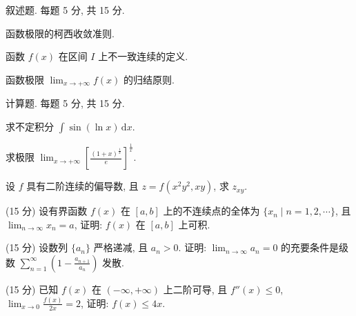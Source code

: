 \par{}
叙述题. 每题 5 分, 共 15 分.\par
函数极限的柯西收敛准则.\par
函数 $f(x)$ 在区间 $I$ 上不一致连续的定义.\par
函数极限 $\lim_{x\to +\infty}f(x)$ 的归结原则.\par
\par{}
计算题. 每题 5 分, 共 15 分.\par
求不定积分 $\int \sin (\ln x) \, \mathrm{d}x$.\par
求极限 $\lim_{x\to +\infty}\left[\frac{(1 + x)^{\frac{1}{x}}}{e}\right]^{\frac{1}{x}}.$\par
设 $f$ 具有二阶连续的偏导数, 且 $z = f(x^{2}y^{2}, xy)$, 求 $z_{xy}$.\par
\par{}
(15 分) 设有界函数 $f(x)$ 在 $[a, b]$ 上的不连续点的全体为 $\{x_n \mid n = 1, 2, \cdots\}$, 且 $\lim_{n \to \infty} x_n = a$, 证明: $f(x)$ 在 $[a, b]$ 上可积.\par
\par{}
(15 分) 设数列 $\{a_{n}\}$ 严格递减, 且 $a_{n} > 0$. 证明: $\lim_{n \to \infty} a_{n} = 0$ 的充要条件是级数 $\sum_{n=1}^{\infty} \left(1 - \frac{a_{n+1}}{a_{n}}\right)$ 发散.\par
\par{}
(15 分) 已知 $f(x)$ 在 $(- \infty, +\infty)$ 上二阶可导, 且 $f''(x) \leq 0$, $\lim_{x \to 0} \frac{f(x)}{2x} = 2$, 证明: $f(x) \leq 4x$.\par
